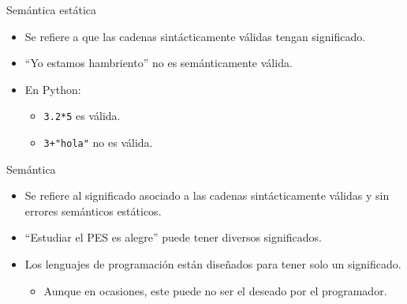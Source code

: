 \documentclass[mathserif]{beamer}
\begin{document}
\begin{frame}{Semántica estática}
    \begin{itemize}
        \item Se refiere a que las cadenas sintácticamente válidas tengan significado. 
        
        \item ``Yo estamos hambriento'' no es semánticamente válida.
        
        \item En Python: 
        \begin{itemize}
            \item \lstinline|3.2*5| es válida.
            \item \lstinline|3+"hola"| no es válida.
        \end{itemize}
    \end{itemize}
\end{frame}

\begin{frame}{Semántica}
    \begin{itemize}
        \item Se refiere al significado asociado a las cadenas {\blue sintácticamente válidas} y sin errores {\blue semánticos estáticos}.
        
        \item ``Estudiar el PES es alegre'' puede tener diversos significados.
        
        \item Los lenguajes de programación están diseñados para tener solo un significado. 
            \begin{itemize}
                \item Aunque en ocasiones, este puede no ser el deseado por el programador.
            \end{itemize}
    \end{itemize}
\end{frame}
\end{document}
